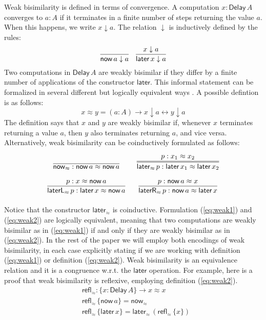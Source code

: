 \documentclass[runningheads,a4paper]{llncs}
\newcommand{\Delay}{\ensuremath{\mathsf{Delay}\,}}
\newcommand{\now}{\mathsf{now}}
\newcommand{\later}{\mathsf{later}}
\newcommand{\laterR}{\mathsf{laterR}}
\newcommand{\laterL}{\mathsf{laterL}}
\newcommand{\dn}{\downarrow}
\newcommand{\refl}{\mathsf{refl}}
\begin{document}
Weak bisimilarity is defined in terms of convergence. A computation
$x : \Delay A$ converges to $a : A$ if it terminates in a finite
number of steps returning the value $a$. When this happens, we write
$x \dn a$. The relation $\dn$ is inductively defined by the rules:
\[
\infer{\now\,a \dn a}{}
\quad
\infer{\later\,x \dn a}{x \dn a}
\]
Two computations in $\Delay A$ are weakly bisimilar if they differ by
a finite number of applications of the constructor $\later$. This
informal statement can be formalized in several different but
logically equivalent ways \cite{ChapmanUV19}. 
A possible defintion is as follows:
\begin{equation}\label{eq:weak1}
x \approx y = (a : A) \to x \dn a \leftrightarrow y \dn a
\end{equation}
The definition says that $x$ and $y$ are weakly bisimilar if, whenever
$x$ terminates returning a value $a$, then $y$ also terminates
returning $a$, and vice versa.
Alternatively, weak bisimilarity can be coinductively formulated as follows:
\begin{equation}
\label{eq:weak2}
\arraycolsep=8pt\def\arraystretch{2.8}
\begin{array}{cc}
\infer{\now_{\approx}  : \now\,a \approx \now\,a}{}
&
\infer={\later_{\approx} \,p : \later\,x_1 \approx \later\,x_2}{p : x_1 \approx x_2}
\\
\infer{\laterL_{\approx} \, p: \later\,x \approx \now\,a}{p : x \approx \now \,a}
&
\infer{\laterR_{\approx} \, p: \now\,a \approx \later\,x}{p : \now\,a \approx x}
\end{array}
\end{equation}
Notice that the constructor $\later_{\approx}$ is
coinductive. Formulation (\ref{eq:weak1}) and (\ref{eq:weak2}) are
logically equivalent, meaning that two computations are weakly
bisimilar as in (\ref{eq:weak1}) if and only if they are weakly
bisimilar as in (\ref{eq:weak2}).
In the rest of the paper we will employ
both encodings of weak bisimilarity, in each case explicitly stating
if we are working with definition (\ref{eq:weak1}) or definition (\ref{eq:weak2}).
Weak bisimilarity is an equivalence
relation and it is a congruence w.r.t. the $\later$ operation.
For example, here is a proof that weak bisimilarity is reflexive,
employing definition (\ref{eq:weak2}).
\begin{align*}
& \refl_{\approx} : \{x : \Delay A\} \to x \approx x \\
& \refl_{\approx} \,\{\now\,a\} = \now_\approx \\
& \refl_{\approx} \,\{\later\,x\} = \later_\approx\,(\refl_\approx \,\{x\})
\end{align*}
\end{document}

